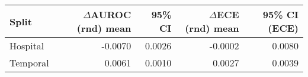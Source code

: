 \begin{tabular}{lrrrr}
\toprule
Split & $\Delta$AUROC (rnd) mean & 95\% CI & $\Delta$ECE (rnd) mean & 95\% CI (ECE) \\
\midrule
Hospital & -0.0070 & 0.0026 & -0.0002 & 0.0080 \\
Temporal & 0.0061 & 0.0010 & 0.0027 & 0.0039 \\
\bottomrule
\end{tabular}
